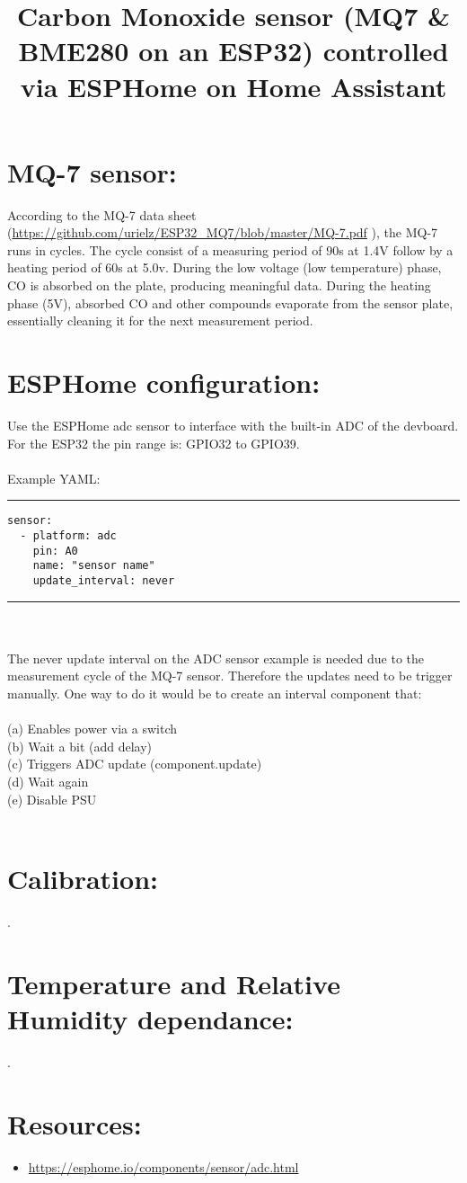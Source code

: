 \documentclass{article}
\begin{document}
\title{Carbon Monoxide sensor (MQ7 \& BME280 on an ESP32) controlled via ESPHome on Home Assistant}
\maketitle


\section*{MQ-7 sensor:}
According to the MQ-7 data sheet (\url{https://github.com/urielz/ESP32_MQ7/blob/master/MQ-7.pdf}
), the MQ-7 runs in cycles. The cycle consist of a measuring period of 90s at
1.4V follow by a heating period of 60s at 5.0v. During the low voltage (low
temperature) phase, CO is absorbed on the plate, producing meaningful data. 
During the heating phase (5V), absorbed CO and other compounds evaporate from
the sensor plate, essentially cleaning it for the next measurement period.

\section*{ESPHome configuration:} 
Use the ESPHome adc sensor to interface with the built-in ADC of the devboard.
For the ESP32 the pin range is: GPIO32 to GPIO39.\\\\

Example YAML:\\
{\color{Gray} \rule{\linewidth}{0.6mm} }

\begin{verbatim}
sensor:
  - platform: adc
    pin: A0
    name: "sensor name"
    update_interval: never
\end{verbatim}
{\color{Gray} \rule{\linewidth}{0.6mm} }\\\\


The never update interval on the ADC sensor example is needed due to the measurement cycle of the MQ-7 sensor. 
Therefore the updates need to be trigger manually.
One way to do it would be to create an interval component that:\\\\
(a) Enables power via a switch\\
(b) Wait a bit (add delay)\\
(c) Triggers ADC update (component.update)\\
(d) Wait again\\
(e) Disable PSU\\\\

\section*{Calibration:}
.
\section*{Temperature and Relative Humidity dependance:}
.
\section*{Resources:}
\begin{itemize}
    \item\url{https://esphome.io/components/sensor/adc.html} 
\end{itemize}
\end{document}
